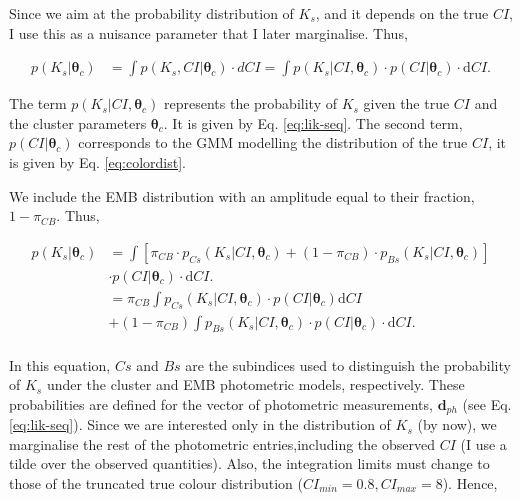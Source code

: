 Since we aim at the probability distribution of $K_s$, and it depends on the true $CI$, I use this as a nuisance parameter that I later marginalise. Thus, 

\begin{align}
p(K_s | \boldsymbol{\theta}_c) & = \int p(K_s,CI | \boldsymbol{\theta}_c) \cdot dCI =  \int p(K_s | CI ,\boldsymbol{\theta}_c) \cdot p(CI|\boldsymbol{\theta}_c)\cdot \mathrm{d}CI. \nonumber
\end{align}

The term $p(K_s | CI ,\boldsymbol{\theta}_c)$ represents the probability of $K_s$ given the true $CI$ and the cluster parameters $\boldsymbol{\theta}_c$. It is given by Eq. \ref{eq:lik-seq}. The second term, $p(CI|\boldsymbol{\theta}_c)$ corresponds to the GMM modelling the distribution of the true $CI$, it is given by Eq. \ref{eq:colordist}. 

We include the EMB  distribution with an amplitude equal to their fraction, $1-\pi_{CB}$. Thus,

\begin{align}
p(K_s | \boldsymbol{\theta}_c) & =  \int \left[\pi_{CB}\cdot p_{Cs}(K_s| CI, \boldsymbol{\theta}_c) + (1-\pi_{CB})\cdot p_{Bs}(K_s| CI, \boldsymbol{\theta}_c)\right]\nonumber \\& \cdot p(CI|\boldsymbol{\theta}_c)\cdot \mathrm{d}CI. \nonumber \\
& =   \pi_{CB} \int p_{Cs}(K_s| CI, \boldsymbol{\theta}_c) \cdot p(CI|\boldsymbol{\theta}_c) \mathrm{d}CI \nonumber \\
&+ (1-\pi_{CB})\int p_{Bs}(K_s| CI, \boldsymbol{\theta}_c) \cdot p(CI|\boldsymbol{\theta}_c)\cdot  \mathrm{d}CI. \nonumber \\
\end{align}

In this equation, $Cs$ and $Bs$ are the subindices used to distinguish the probability of $K_s$ under the cluster and EMB photometric models, respectively. These probabilities are defined for the vector of photometric measurements, $\boldsymbol{d}_{ph}$ (see Eq. \ref{eq:lik-seq}). Since we are interested only in the distribution of $K_s$ (by now), we marginalise the rest of the photometric entries,including the observed $CI$ (I use a tilde over the observed quantities). Also, the integration limits must change to those of the truncated true colour distribution ($CI_{min}=0.8, CI_{max}=8$). Hence,

